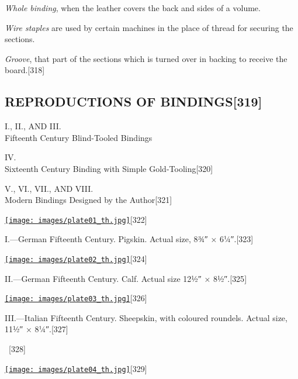 \documentclass[
]{article}
\begin{document}
\emph{Whole binding}, when the leather covers the back and sides of a
volume.

\emph{Wire staples} are used by certain machines in the place of thread
for securing the sections.

\emph{Groove}, that part of the sections which is turned over in backing
to receive the board.{\protect\hypertarget{Page_318}{}{{[}318{]}}}

\hypertarget{reproductions-of-bindings319}{%
\subsection[REPRODUCTIONS OF
BINDINGS]{\texorpdfstring{\protect\hypertarget{REPRODUCTIONS_OF_BINDINGS}{}{}REPRODUCTIONS
OF
BINDINGS{\protect\hypertarget{Page_319}{}{{[}319{]}}}}{REPRODUCTIONS OF BINDINGS{[}319{]}}}\label{reproductions-of-bindings319}}

I., II., AND III.\\
{Fifteenth Century Blind-Tooled Bindings}

IV.\\
{Sixteenth Century Binding with Simple
Gold-Tooling}{\protect\hypertarget{Page_320}{}{{[}320{]}}}

V., VI., VII., AND VIII.\\
{Modern Bindings Designed by the
Author{\protect\hypertarget{Page_321}{}{{[}321{]}}}}

\href{images/plate01.jpg}{\texttt{[image: images/plate01\_th.jpg]}}{\protect\hypertarget{Page_322}{}{{[}322{]}}}

I.---German Fifteenth Century. Pigskin. Actual size, 8¾″ ×
6¼″.{\protect\hypertarget{Page_323}{}{{[}323{]}}}

\href{images/plate02.jpg}{\texttt{[image: images/plate02\_th.jpg]}}{\protect\hypertarget{Page_324}{}{{[}324{]}}}

II.---German Fifteenth Century. Calf. Actual size 12½″ ×
8½″.{\protect\hypertarget{Page_325}{}{{[}325{]}}}

\href{images/plate03.jpg}{\texttt{[image: images/plate03\_th.jpg]}}{\protect\hypertarget{Page_326}{}{{[}326{]}}}

III.---Italian Fifteenth Century. Sheepskin, with coloured roundels.
Actual size, 11½″ × 8¼″.{\protect\hypertarget{Page_327}{}{{[}327{]}}}

~{\protect\hypertarget{Page_328}{}{{[}328{]}}}

\href{images/plate04.jpg}{\texttt{[image: images/plate04\_th.jpg]}}{\protect\hypertarget{Page_329}{}{{[}329{]}}}
\end{document}
